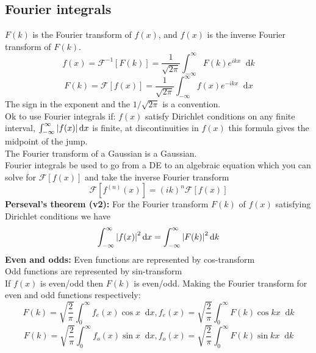 \documentclass[a4paper, 10pt]{article}
\newcommand*\diff{\mathop{}\!\mathrm{d}}
\begin{document}
\begin{multicols*}{3}
\begin{mdframed}
\subsection*{Fourier integrals}
\end{mdframed}
$F(k)$ is the Fourier transform of $f(x)$, and $f(x)$ is the inverse Fourier transform of $F(k)$.
$$ f(x) = \mathcal{F}^{-1}\left[ F(k) \right] = \frac{1}{\sqrt{2\pi}} \int_{-\infty}^{\infty} F(k) e^{ikx} \diff k $$
$$ F(k) = \mathcal{F}\left[ f(x) \right] = \frac{1}{\sqrt{2\pi}} \int_{-\infty}^{\infty} f(x) e^{-ik x} \diff x$$
The sign in the exponent and the $1/\sqrt{2\pi}$ is a convention.\\
Ok to use Fourier integrals if: $f(x)$ satisfy Dirichlet conditions on any finite interval, $\int_{-\infty}^{\infty} \abs{f(x)} \diff x$ is finite, at discontinuities in $f(x)$ this formula gives the midpoint of the jump.\\
The Fourier transform of a Gaussian is a Gaussian.\\
Fourier integrals be used to go from a DE to an algebraic equation which you can solve for $\mathcal{F}\left[ f(x) \right]$ and take the inverse Fourier transform
$$ \mathcal{F}\left[ f^{(n)}(x) \right] = (ik)^n\mathcal{F}\left[ f(x) \right]$$
\textbf{Perseval's theorem (v2):}
For the Fourier transform $F(k)$ of $f(x)$ satisfying Dirichlet conditions we have
$$\int_{-\infty}^{\infty} \abs{f(x)}^2 \diff x = \int_{-\infty}^{\infty} \abs{F(k)}^2 \diff k $$
\textbf{Even and odds:}
Even functions are represented by cos-transform\\
Odd  functions are represented by sin-transform\\
If $f(x)$ is even/odd then $F(k)$ is even/odd. Making the Fourier transform for even and odd functions respectively:
$$F(k) = \sqrt{\frac{2}{\pi}}\int_0^\infty f_e(x) \cos{x}\diff x, f_e(x) = \sqrt{\frac{2}{\pi}} \int_0^\infty F(k)\cos{kx} \diff k$$
$$F(k) = \sqrt{\frac{2}{\pi}}\int_0^\infty f_o(x) \sin{x}\diff x, f_o(x) = \sqrt{\frac{2}{\pi}} \int_0^\infty F(k)\sin{kx} \diff k$$

\begin{mdframed}

\end{mdframed}
\end{multicols*}
\end{document}
